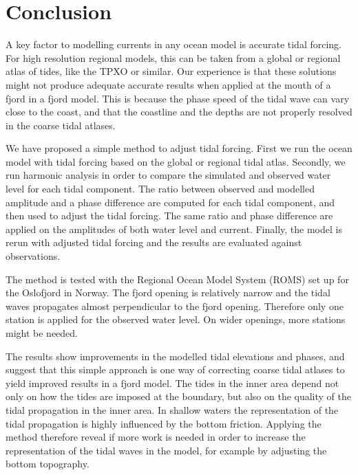 \section{Conclusion}

A key factor to modelling currents in any ocean model is accurate tidal forcing. For high resolution regional models, this can be taken from a global or regional atlas of tides, like the TPXO or similar. Our experience is that these solutions might not produce adequate accurate results when applied at the mouth of a fjord in a fjord model. This is because the phase speed of the tidal wave can vary close to the coast, and that the coastline and the depths are not properly resolved in the coarse tidal atlases.

We have proposed a simple method to adjust tidal forcing. First we run the ocean model with tidal forcing based on the global or regional tidal atlas. Secondly, we run harmonic analysis in order to compare the simulated and observed water level for each tidal component. The ratio between observed and modelled amplitude and a phase difference are computed for each tidal component, and then used to adjust the tidal forcing. The same ratio and phase difference are applied on the amplitudes of both water level and current. Finally, the model is rerun with adjusted tidal forcing and the results are evaluated against observations.

The method is tested with the Regional Ocean Model System (ROMS) set up for the Oslofjord in Norway. The fjord opening is relatively narrow and the tidal waves propagates almost perpendicular to the fjord opening. Therefore only one station is applied for the observed water level. On wider openings, more stations might be needed. 
 
The results show improvements in the modelled tidal elevations and phases, and suggest that this simple approach is one way of correcting coarse tidal atlases to yield improved results in a fjord model. The tides in the inner area depend not only on how the tides are imposed at the boundary, but also on the quality of the tidal propagation in the inner area. In shallow waters the representation of the tidal propagation is highly influenced by the bottom friction. Applying the method therefore reveal if more work is needed in order to increase the representation of the tidal waves in the model, for example by adjusting the bottom topography.
